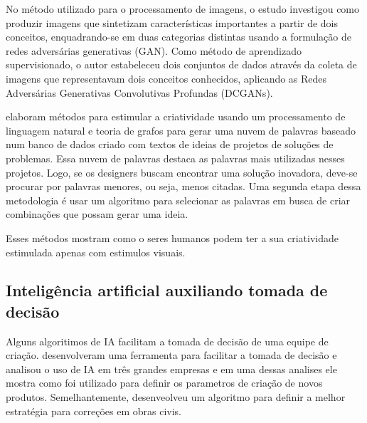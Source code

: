 No método utilizado para o processamento de imagens, o estudo investigou como produzir imagens que sintetizam características importantes a partir de dois conceitos, enquadrando-se em duas categorias distintas usando a formulação de redes adversárias generativas (GAN). Como método de aprendizado supervisionado, o autor estabeleceu dois conjuntos de dados através da coleta de imagens que representavam dois conceitos conhecidos, aplicando as Redes Adversárias Generativas Convolutivas Profundas (DCGANs).


 elaboram métodos para estimular a criatividade usando um processamento de linguagem natural e teoria de grafos para gerar uma nuvem de palavras baseado num banco de dados criado com textos de ideias de projetos de soluções de problemas. Essa nuvem de palavras destaca as palavras mais utilizadas nesses projetos. Logo, se os designers buscam encontrar uma solução inovadora, deve-se procurar por palavras menores, ou seja, menos citadas. Uma segunda etapa dessa metodologia é usar um algoritmo para selecionar as palavras em busca de criar combinações que possam gerar uma ideia.


Esses métodos mostram como o seres humanos podem ter a sua criatividade estimulada apenas com estimulos visuais.


\subsection*{Inteligência artificial auxiliando tomada de decisão}

Alguns algoritimos de IA facilitam a tomada de decisão de uma equipe de criação.  desenvolveram uma ferramenta para facilitar a tomada de decisão e  analisou o uso de IA em três grandes empresas e em uma dessas analises ele mostra como foi utilizado para definir os parametros de criação de novos produtos. Semelhantemente,  desenveolveu um algoritmo para definir a melhor estratégia para correções em obras civis.

